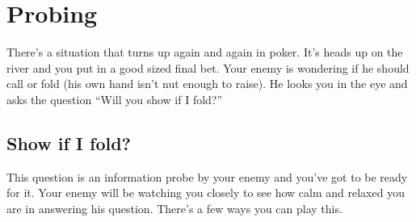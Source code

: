 \chapter{Probing}


There's a situation that turns up again and again in poker.
It's heads up on the river and you put in a good sized final bet.
Your enemy is wondering if he should call or fold (his own hand
isn't nut enough to raise). He looks you in the eye and
asks the question ``Will you show if I fold?''

\section{Show if I fold?}

This question is an information probe by your enemy and you've got
to be ready for it. Your enemy will be watching you closely
to see how calm and relaxed you are in answering his question.
There's a few ways you can play this.

